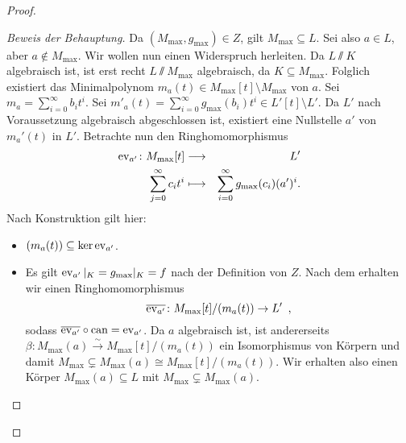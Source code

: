 \documentclass[12pt,a4paper]{scrartcl}
\begin{document}
\begin{proof}
\begin{enumerate}
\begin{itemize}
			\begin{proof}[Beweis der Behauptung]
				Da $(M_{\max}, g_{\max})\in Z$, gilt $M_{\max}\subseteq L$. Sei also $a\in L$, aber $a\notin M_{\max}$. Wir wollen nun einen Widerspruch herleiten. Da $L\sslash K$ algebraisch ist, ist erst recht $L\sslash M_{\max}$ algebraisch, da $K\subseteq M_{\max}$. Folglich existiert das Minimalpolynom $m_a(t)\in M_{\max}[t]\setminus M_{\max}$ von $a$. Sei $m_a = \sum_{i = 0}^{\infty}b_it^i$.  Sei $m'_a(t) = \sum_{i = 0}^{\infty}g_{\max}(b_i)t^i\in L'[t]\setminus L'$. Da $L'$ nach Voraussetzung algebraisch abgeschlossen ist, existiert eine Nullstelle $a'$ von $m_a'(t)$ in $L'$. Betrachte nun den Ringhomomorphismus
				\begin{eqnarray*}
					\operatorname{ev}_{a'}\colon M_{\max}[t] &\longrightarrow& L'\\
					\sum_{j = 0}^{\infty} c_it^i &\longmapsto& \sum_{i = 0}^{\infty} g_{\max}(c_i)(a')^i.
				\end{eqnarray*}
				Nach Konstruktion gilt hier:
				\begin{itemize}
					\item $(m_a(t))\subseteq \operatorname{ker}\operatorname{ev}_{a'}$.
					\item Es gilt $\operatorname{ev}_{a'}|_K = g_{\max}|_K = f$ nach der Definition von $Z$. Nach dem  erhalten wir einen Ringhomomorphismus
					\[\overline{\operatorname{ev}_{a'}}\colon M_{\max}[t]/(m_a(t))\to L'\enspace,\]
					sodass $\overline{\operatorname{ev}_{a'}}\circ \operatorname{can} = \operatorname{ev}_{a'}$. Da $a$ algebraisch ist, ist andererseits $\beta: M_{\max}(a) \xrightarrow{\sim} M_{\max}[t]/(m_a(t))$ ein Isomorphismus von Körpern und damit $M_{\max}\subsetneq M_{\max}(a)\cong M_{\max}[t]/(m_a(t))$. Wir erhalten also einen Körper $M_{\max}(a)\subseteq L$ mit $M_{\max}\subsetneq M_{\max}(a)$.
					

\end{itemize}
\end{proof}
\end{itemize}
\end{enumerate}
\end{proof}
\end{document}
